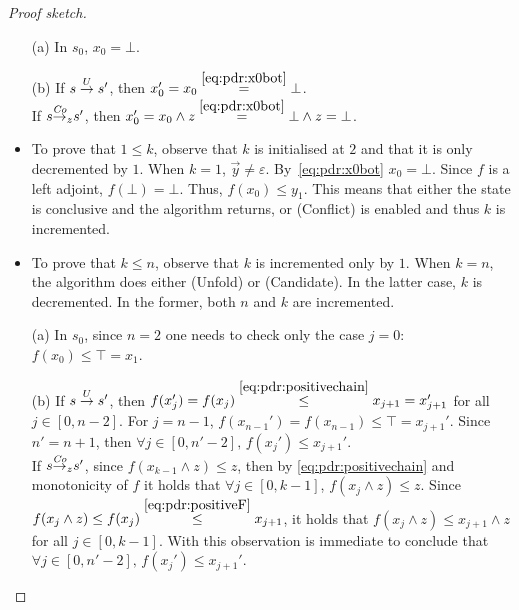 \begin{proof}[Proof sketch]
	\begin{itemize}
		\item[(a)] In $s_0$, $x_0= \bot$.
		\item[(b)] If $s \stackrel{U}{\to} s'$, then $x_0' = x_0 \stackrel{{\eqref{eq:pdr:x0bot}}}{=}\bot$. \\
		      If $s {\stackrel{\mathit{Co}}{\to}}_{z} s'$, then $x_0'=x_0 \land z \stackrel{{\eqref{eq:pdr:x0bot}}}{=} \bot \land z = \bot$.
	\end{itemize}

	\begin{itemize}
		\item To prove that $1 \leq k$, observe that $k$ is initialised at $2$ and that it is only decremented by $1$. When $k=1$, $\vec{y}\neq \varepsilon$. By~\eqref{eq:pdr:x0bot} $x_0=\bot$. Since $f$ is a left adjoint, $f(\bot) = \bot$. Thus, $f(x_0) \le y_1$. This means that either the state is conclusive and the algorithm returns, or (Conflict) is enabled and thus $k$ is incremented.
		\item To prove that $k \leq n$, observe that $k$ is incremented only by $1$. When $k=n$, the algorithm does either (Unfold) or (Candidate). In the latter case, $k$ is decremented. In the former, both $n$ and $k$ are incremented.
	\end{itemize}

	\begin{itemize}
		\item[(a)] In $s_0$, since $n=2$ one needs to check only the case $j=0$: $f(x_0) \le \top = x_1$.
		\item[(b)] If $s \stackrel{U}{\to} s'$, then $f(x_j') =f(x_j) \stackrel{{\eqref{eq:pdr:positivechain}}}{\le} x_{j+1} =x_{j+1}'$ for all $j\in[0,n-2]$. For $j=n-1$, $f(x_{n-1}') = f(x_{n-1}) \le \top = x_{j+1}'$. Since $n'=n+1$, then $\forall j\in [0,n'-2] \text{, } f(x_j')\le x_{j+1}'$. \\
		      If $s {\stackrel{\mathit{Co}}{\to}}_{z} s'$, since $f(x_{k-1} \land z) \le z$, then by \eqref{eq:pdr:positivechain} and monotonicity of $f$ it holds that $\forall j\in [0,k-1]$, $f(x_{j} \land z) \le z$. Since $f(x_j \land z) \le f(x_j) \stackrel{{\eqref{eq:pdr:positiveF}}}{\le} x_{j+1}$, it holds that $f(x_j \land z) \le x_{j+1} \land z $ for all $j\in[0, k-1]$. With this observation is immediate to conclude that $\forall j\in[0,n'-2] \text{, }f(x_j')\le x_{j+1}'$.
	\end{itemize}


\end{proof}
